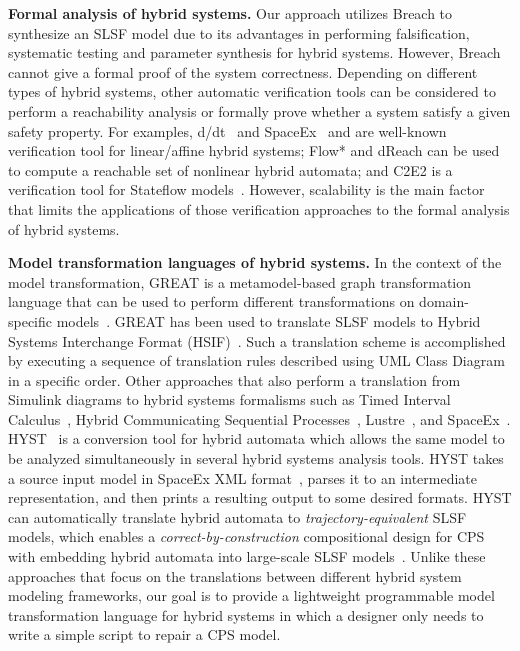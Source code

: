 \vspace{0.5em}
\noindent
{\bf Formal analysis of hybrid systems.} Our approach utilizes Breach to synthesize an SLSF model due to its advantages in performing  falsification, systematic testing and parameter synthesis for hybrid systems. However, Breach cannot give a formal proof of the system correctness. Depending on different types of hybrid systems, other automatic verification tools can be considered to perform a reachability analysis or formally prove whether a system satisfy a given safety property. For examples, d/dt~\cite{asarin2002d} and SpaceEx~\cite{frehse2011cav} and  are well-known verification tool for linear/affine hybrid systems; Flow*\cite{chen2013flow} and dReach\cite{kong2015dreach} can be used to compute a reachable set of nonlinear hybrid automata; and C2E2 is a verification tool for Stateflow models~\cite{duggirala2015c2e2}. 
%
However, scalability is the main factor that limits the applications of those verification approaches to the formal analysis of hybrid systems. 

  
\vspace{0.5em}
\noindent
{\bf Model transformation languages of hybrid systems.} In the context of the model transformation, GREAT is a metamodel-based graph transformation language that can be used to perform different transformations on domain-specific models~\cite{agrawal2003graph, agrawal2003end}. GREAT has been used to translate SLSF models to Hybrid Systems Interchange Format (HSIF)~\cite{agrawal2004semantic}. Such a translation scheme is accomplished by executing a sequence of translation rules described using UML Class Diagram in a specific order. %
% 
Other approaches that also perform a translation from Simulink diagrams to hybrid systems formalisms such as Timed Interval Calculus~\cite{chen2009formal}, Hybrid Communicating Sequential Processes~\cite{liu2010calculus}, Lustre~\cite{tripakis2005translating}, and SpaceEx~\cite{minopoli2016sl2sx}.  
%
HYST~\cite{bak2015hyst} is a conversion tool for hybrid automata which allows the same model to be analyzed simultaneously in several hybrid systems analysis tools. HYST takes a source input model in SpaceEx XML format~\cite{frehse2011spaceex}, parses it to an intermediate representation, and then prints a resulting output to some desired formats. HYST can automatically translate hybrid automata to \emph{trajectory-equivalent} SLSF models, which enables a \emph{correct-by-construction} compositional design for CPS with embedding hybrid automata into large-scale SLSF models~\cite{bak2017hybrid}.  
%
Unlike these approaches that focus on the translations between different hybrid system modeling frameworks, our goal is to provide a lightweight programmable model transformation language for hybrid systems in which a designer only needs to write a simple script to repair a CPS model.  
 
